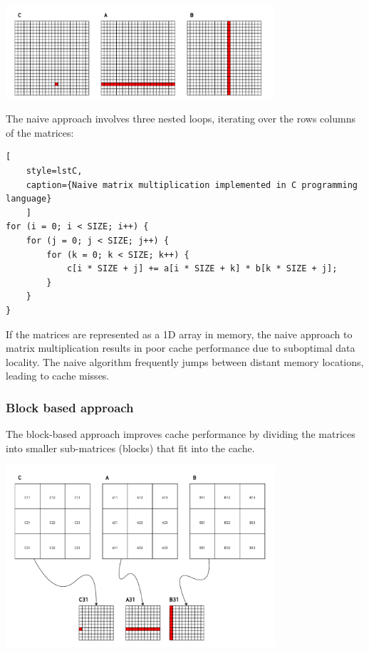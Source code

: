 \begin{center}
	\centering
	\includegraphics[width=0.75\textwidth]{figures/05-analysis/mm_naive.pdf}
	\label{fig:mm_naive}
\end{center}

The naive approach involves three nested loops, iterating over the rows columns of the matrices:

\begin{center}
\centering
\begin{minipage}{\linewidth}
\begin{lstlisting}[
	style=lstC,
    caption={Naive matrix multiplication implemented in C programming language}
    ]
for (i = 0; i < SIZE; i++) {
	for (j = 0; j < SIZE; j++) {
		for (k = 0; k < SIZE; k++) {
			c[i * SIZE + j] += a[i * SIZE + k] * b[k * SIZE + j];
		}
	}
}
\end{lstlisting}
\end{minipage}
\end{center}

\noindent If the matrices are represented as a 1D array in memory, the naive approach to matrix multiplication results in poor cache performance due to suboptimal data locality.
The naive algorithm frequently jumps between distant memory locations, leading to cache misses.

\subsubsection*{Block based approach} \label{sec:mmblock}
The block-based approach improves cache performance by dividing the matrices into smaller sub-matrices (blocks) that fit into the cache.

\begin{center}
	\centering
	\includegraphics[width=0.75\textwidth]{figures/05-analysis/mm_block.pdf}
	\label{fig:mm_block}
\end{center}

